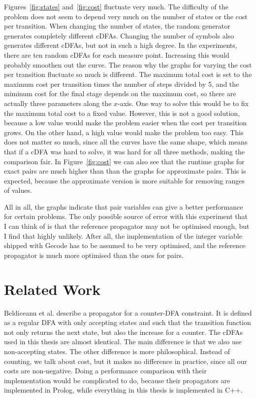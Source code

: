 \documentclass[a4paper,11pt]{article}
\begin{document}
Figures~\ref{fig:states} and~\ref{fig:cost} fluctuate very much. The difficulty of the problem does not seem to depend very much on the number of states or the cost per transition. When changing the number of states, the random generator generates completely different cDFAs. Changing the number of symbols also generates different cDFAs, but not in such a high degree. In the experiments, there are ten random cDFAs for each measure point. Increasing this would probably smoothen out the curve. The reason why the graphs for varying the cost per transition fluctuate so much is different. The maximum total cost is set to the maximum cost per transition times the number of steps divided by 5, and the miminum cost for the final stage depends on the maximum cost, so there are actually three parameters along the $x$-axis. One way to solve this would be to fix the maximum total cost to a fixed value. However, this is not a good solution, because a low value would make the problem easier when the cost per transition grows. On the other hand, a high value would make the problem too easy. This does not matter so much, since all the curves have the same shape, which means that if a cDFA was hard to solve, it was hard for all three methods, making the comparison fair. In Figure~\ref{fig:cost} we can also see that the runtime graphs for exact pairs are much higher than than the graphs for approximate pairs. This is expected, because the approximate version is more suitable for removing ranges of values.

All in all, the graphs indicate that pair variables can give a better performance for certain problems. The only possible source of error with this experiment that I can think of is that the reference propagator may not be optimised enough, but I find that highly unlikely. After all, the implementation of the integer variable shipped with Gecode has to be assumed to be very optimised, and the reference propagator is much more optimised than the ones for pairs.

\section{Related Work}
Beldiceanu et al. \cite{Beldiceanu675954} describe a propagator for a counter-DFA constraint. It is defined as a regular DFA with only accepting states and such that the transition function not only returns the next state, but also the increase for a counter. The cDFAs used in this thesis are almost identical. The main difference is that we also use non-accepting states. The other difference is more philosophical. Instead of counting, we talk about cost, but it makes no difference in practice, since all our costs are non-negative. Doing a performance comparison with their implementation would be complicated to do, because their propagators are implemented in Prolog, while everything in this thesis is implemented in C++.
\end{document}
